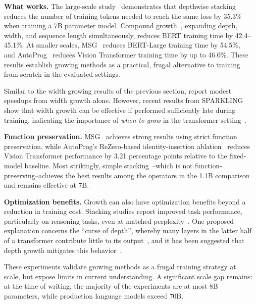 \textbf{What works.} The large-scale study~\citep{du_stacking_2024} demonstrates that depthwise stacking reduces the number of training tokens needed to reach the same loss by 35.3\% when training a 7B parameter model. Compound growth~\citep{gu_bert_2021}, expanding depth, width, and sequence length simultaneously, reduces BERT training time by 42.4--45.1\%. At smaller scales, MSG~\citep{yao_msg_2024} reduces BERT-Large training time by 54.5\%, and AutoProg~\citep{li_autoprog_2022} reduces Vision Transformer training time by up to 46.0\%. These results establish growing methods as a practical, frugal alternative to training from scratch in the evaluated settings.

Similar to the width growing results of the previous section, \citet{du_stacking_2024} report modest speedups from width growth alone. However, recent results from SPARKLING show that width growth can be effective if performed sufficiently late during training, indicating the importance of \emph{when to grow} in the transformer setting~\citep{yu_sparkling_2026}.

\textbf{Function preservation.} MSG~\citep{yao_msg_2024} achieves strong results using strict function preservation, while AutoProg's ReZero-based identity-insertion ablation~\citep{li_autoprog_2022} reduces Vision Transformer performance by 3.21 percentage points relative to the fixed-model baseline. Most strikingly, simple stacking~\citep{du_stacking_2024}--which is not function-preserving--achieves the best results among the operators in the 1.1B comparison and remains effective at 7B.

\textbf{Optimization benefits.} Growth can also have optimization benefits beyond a reduction in training cost.
Stacking studies report improved task performance, particularly on reasoning tasks, even at matched perplexity~\citep{saunshi_inductive_2024,kapl2025depthgrownmodelsovercomecurse}.
One proposed explanation concerns the ``curse of depth'', whereby many layers in the latter half of a transformer contribute little to its output~\citep{sun_curse_of_depth_2025}, and it has been suggested that depth growth mitigates this behavior~\citep{kapl2025depthgrownmodelsovercomecurse}.

These experiments validate growing methods as a frugal training strategy at scale, but expose limits in current understanding. A significant scale gap remains: at the time of writing, the majority of the experiments are at most 8B parameters, while production language models exceed 70B.
